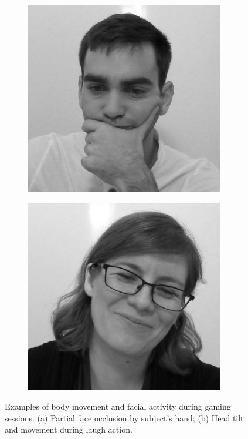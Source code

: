 \begin{figure}
\centering
  \begin{subfigure}[b]{0.5\textwidth}
    \includegraphics[width=0.95\textwidth]{figures/face-occlusion}
    \caption{}
    \label{fig:face-occlusion}
  \end{subfigure}%
  \begin{subfigure}[b]{0.5\textwidth}
    \centering
    \includegraphics[width=0.95\textwidth]{figures/head-tilt}
    \caption{}
    \label{fig:head-tilt}
  \end{subfigure}
  \caption{Examples of body movement and facial activity during gaming sessions. (a) Partial face occlusion by subject's hand; (b) Head tilt and movement during laugh action.}
  \label{fig:face-variation}
\end{figure}

